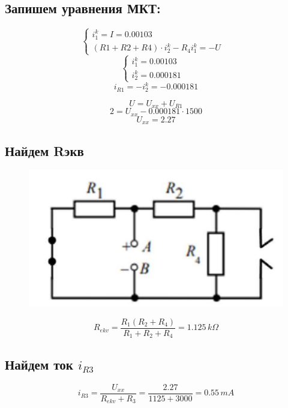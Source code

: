 \documentclass[a4paper,12pt]{report}
\begin{document}
\begin{flushleft}
    \subsection*{Запишем уравнения МКТ:}
    \[\begin{cases}
        i_1^k = I = 0.00103 &
      \\
        (R1+R2+R4)\cdot i_2^k - R_4i_1^k = -U &
      \end{cases}
    \]
    \[\begin{cases}
        i_1^k = 0.00103 &
      \\
        i_2^k = 0.000181 &
      \end{cases}\]
    \[ i_{R1} = -i_2^k = -0.000181 \]
    
    \[ U = U_{xx} + U_{R1} \]
    \[ 2 = U_{xx} - 0.000181 \cdot 1500 \]
    \[ U_{xx} = 2.27 \]
    
    \newpage
    \subsection*{Найдем Rэкв}
    \begin{figure}[h!]
        \includegraphics[width=1.0\textwidth]{scheme_5.png}
        \label{ris:image5}
    \end{figure}

    \[ R_{ekv} = \frac{R_1(R_2 + R_4)}{R_1+R_2+R_4} = 1.125 \, k\Omega  \]

    \subsection*{Найдем ток $i_{R3}$}
    \[ i_{R3} = \frac{U_{xx}}{R_{ekv} + R_3} = \frac{2.27}{1125 + 3000} = 0.55 \, mA \]


\end{flushleft}
\end{document}
